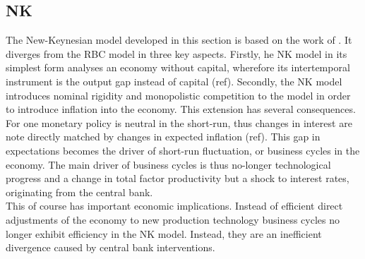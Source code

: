 \documentclass[12pt,a4paper,english]{article} %
\begin{document}
	
	\subsection{NK}
	The New-Keynesian model developed in this section is based on the work of \cite{gali_monetary_2008}. It diverges from the RBC model in three key aspects. Firstly, he NK model in its simplest form analyses an economy without capital, wherefore its intertemporal  instrument is the output gap instead of capital (ref). Secondly, the NK model introduces nominal rigidity and monopolistic competition to the model in order to introduce inflation into the economy. This extension has several consequences. For one monetary policy is neutral in the short-run, thus changes in interest are note directly matched by changes in expected inflation (ref). This gap in expectations becomes the driver of short-run fluctuation, or business cycles in the economy. The main driver of business cycles is thus no-longer technological progress and a change in total factor productivity but a shock to interest rates, originating from the central bank. \\
	This of course has important economic implications. Instead of efficient direct adjustments of the economy to new production technology business cycles no longer exhibit efficiency in the NK model. Instead, they are an inefficient divergence caused by central bank interventions.
		
\end{document}
